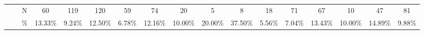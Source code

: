 \documentclass{sigchi}
\begin{document}
\begin{table}[t]
\begin{adjustbox}{width=1\textwidth}
\begin{tabular}{ccccccccccccccccc}
			\multicolumn{1}{|c|}{}                               & \multicolumn{1}{c|}{}                        & \multicolumn{1}{c|}{N}     & \multicolumn{1}{c|}{60}                                   & \multicolumn{1}{c|}{119}                                 & \multicolumn{1}{c|}{120}                                  & \multicolumn{1}{c|}{59}                                  & \multicolumn{1}{c|}{74}                                        & \multicolumn{1}{c|}{20}                                     & \multicolumn{1}{c|}{5}                                & \multicolumn{1}{c|}{8}                               & \multicolumn{1}{c|}{18}                              & \multicolumn{1}{c|}{71}                              & \multicolumn{1}{c|}{67}                              & \multicolumn{1}{c|}{10}                              & \multicolumn{1}{c|}{47}                                   & \multicolumn{1}{c|}{81}                                  \\ \cline{3-17} 
			\multicolumn{1}{|c|}{}                               & \multicolumn{1}{c|}{}                        & \multicolumn{1}{c|}{\%}  & \multicolumn{1}{c|}{13.33\%}                              & \multicolumn{1}{c|}{9.24\%}                              & \multicolumn{1}{c|}{12.50\%}                              & \multicolumn{1}{c|}{6.78\%}                              & \multicolumn{1}{c|}{12.16\%}                                   & \multicolumn{1}{c|}{10.00\%}                                & \multicolumn{1}{c|}{20.00\%}                          & \multicolumn{1}{c|}{37.50\%}                         & \multicolumn{1}{c|}{5.56\%}                          & \multicolumn{1}{c|}{7.04\%}                          & \multicolumn{1}{c|}{13.43\%}                         & \multicolumn{1}{c|}{10.00\%}                         & \multicolumn{1}{c|}{14.89\%}                              & \multicolumn{1}{c|}{9.88\%}                              \\ \cline{3-17} 

\end{tabular}
\end{adjustbox}
\end{table}
\end{document}
